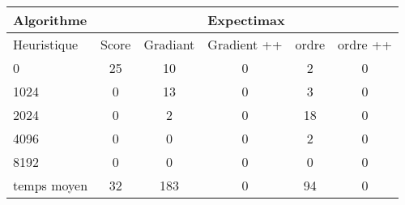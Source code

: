 \documentclass[11pt,a4paper]{article}
\begin{document}
\begin{tabular}{|l|c|c|c|c|c|} 
   \hline
    Algorithme & \multicolumn{5}{c|}{ Expectimax }\\
    \hline
    Heuristique & Score & Gradiant & Gradient ++ & ordre & ordre ++ \\
    \hline
    0 & 25 & 10 & 0 & 2 & 0\\
    \hline
    1024 & 0 & 13 & 0 & 3 & 0\\
    \hline
    2024 & 0 & 2 & 0 & 18 & 0 \\
    \hline
    4096 & 0 & 0 & 0 & 2 & 0 \\
    \hline
    8192 & 0 & 0 & 0 & 0 & 0 \\
    \hline
    temps moyen & 32 & 183 & 0 & 94 & 0 \\
    \hline
\end{tabular}
\end{document}
